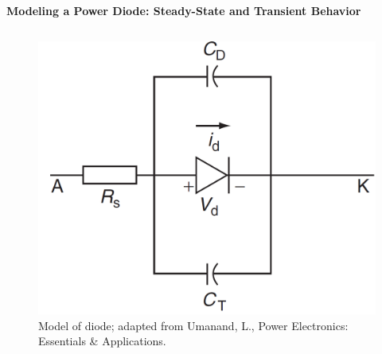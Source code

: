 \begin{frame}{\textbf{Modeling a Power Diode: Steady-State and Transient Behavior}}
\begin{columns}
\begin{column}{0.48\textwidth}
    \begin{figure}
        \centering
        \includegraphics[scale=0.25]{fig/lec04/diode_model.png}
        \caption{Model of diode; adapted from Umanand, L., Power Electronics: Essentials \& Applications.}
        \label{fig:diode_model}
    \end{figure}
\end{column}
\end{columns}
\end{frame}

